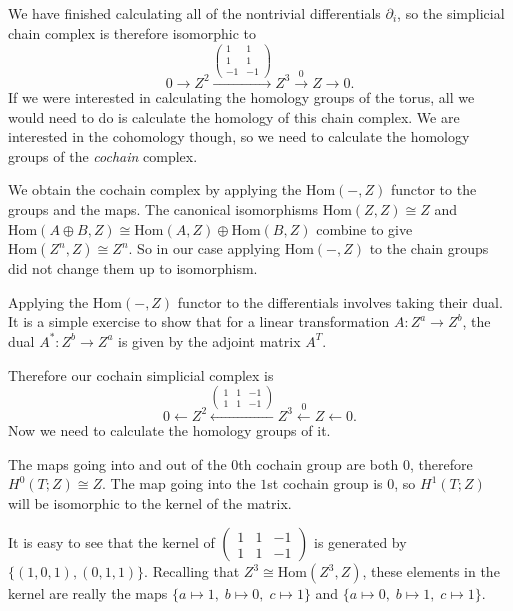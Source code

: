 \documentclass[12pt,a4paper]{article}
\newcommand{\Hom}{\text{Hom}}
\begin{document}
We have finished calculating all of the nontrivial differentials $\partial_i$, so the simplicial chain complex is therefore isomorphic to
\[
0 \rightarrow Z^2 \xrightarrow{\left(\begin{smallmatrix}
    1 & 1 \\
    1 & 1 \\
    -1 & -1 
  \end{smallmatrix}\right)} Z^3 \xrightarrow{0} Z \rightarrow 0.
\]
If we were interested in calculating the homology groups of the torus, all we would need to do is calculate the homology of this chain complex. We are interested in the cohomology though, so we need to calculate the homology groups of the \emph{cochain} complex.

We obtain the cochain complex by applying the $\Hom(-,Z)$ functor to the groups and the maps. The canonical isomorphisms $\Hom(Z,Z) \cong Z$ and $\Hom(A \oplus B,Z) \cong \Hom(A,Z) \oplus \Hom(B,Z)$ combine to give $\Hom(Z^n,Z) \cong Z^n$. So in our case applying $\Hom(-,Z)$ to the chain groups did not change them up to isomorphism.

Applying the $\Hom(-,Z)$ functor to the differentials involves taking their dual. It is a simple exercise to show that for a linear transformation $A:Z^a \rightarrow Z^b$, the dual $A^* : Z^b \rightarrow Z^a$ is given by the adjoint matrix $A^T$.

Therefore our cochain simplicial complex is
\[
0 \leftarrow Z^2 \xleftarrow{\left(\begin{smallmatrix}
    1 & 1 & -1 \\                               
    1 & 1 & -1                          
  \end{smallmatrix}\right)} Z^3 \xleftarrow{0} Z \leftarrow 0.
\]
Now we need to calculate the homology groups of it.

The maps going into and out of the $0$th cochain group are both $0$, therefore $H^0(T;Z) \cong Z$. The map going into the $1$st cochain group is $0$, so $H^1(T;Z)$ will be isomorphic to the kernel of the matrix.

It is easy to see that the kernel of $\left(\begin{smallmatrix}
  1 & 1 & -1 \\
  1 & 1 & -1
\end{smallmatrix}\right)$ is generated by $\{ (1,0,1),(0,1,1) \}$. Recalling that $Z^3 \cong \Hom(Z^3,Z)$, these elements in the kernel are really the maps $\{ a \mapsto 1, \; b \mapsto 0, \; c \mapsto 1 \}$ and $\{ a \mapsto 0, \; b \mapsto 1, \; c \mapsto 1 \}$.
\end{document}
